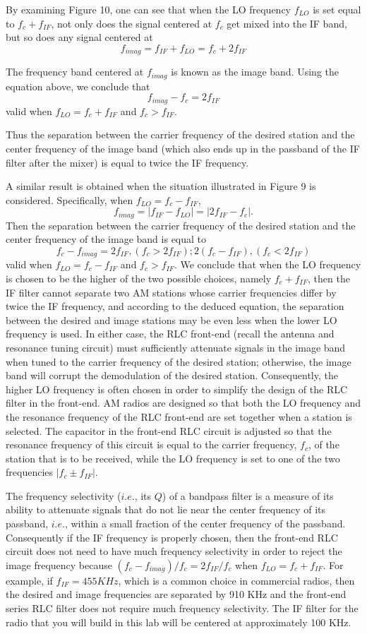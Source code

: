 \documentclass[utf8]{article}
\begin{document}
{	By examining Figure 10, one can see that when the LO frequency $f_{LO}$ is set equal to $f_c + f_{IF}$, not only does the signal centered at $f_c$ get mixed into the IF band, but so does any signal centered at
	$$f_{imag} = f_{IF} + f_{LO} = f_c + 2f_{IF}$$

	The frequency band centered at $f_{imag}$ is known as the image band. Using the equation above, we conclude that
	$$f_{imag}-f_c = 2f_{IF}$$
	valid when $f_{LO} = f_c + f_{IF}$ and $f_c >f_{IF}$.

	Thus the separation between the carrier frequency of the desired station and the center frequency of the image band (which also ends up in the passband of the IF filter after the mixer) is equal to twice the IF frequency.

	A similar result is obtained when the situation illustrated in Figure 9 is considered. Specifically, when $f_{LO} = f_c − f_{IF}$,
	$$f_{imag} = |f_{IF}-f_{LO}| = |2f_{IF}-f_c|.$$
	Then the separation between the carrier frequency of the desired station and the center frequency of the image band is equal to
	$$f_c -f_{imag} = 2f_{IF},(f_c>2f_{IF}); 2(f_c-f_{IF}),(f_c<2f_{IF})$$
	valid when $f_{LO} = f_c-f_{IF}$ and $f_c>f_{IF}$.
	We conclude that when the LO frequency is chosen to be the higher of the two possible choices, namely $f_c + f_{IF}$, then the IF filter cannot separate two AM stations whose carrier frequencies differ by twice the IF frequency, and according to the deduced equation, the separation between the desired and image stations may be even less when the lower LO frequency is used. In either case, the RLC front-end (recall the antenna and resonance tuning circuit) must sufficiently attenuate signals in the image band when tuned to the carrier frequency of the desired station; otherwise, the image band will corrupt the demodulation of the desired station. Consequently, the higher LO frequency is often chosen in order to simplify the design of the RLC filter in the front-end. AM radios are designed so that both the LO frequency and the resonance frequency of the RLC front-end are set together when a station is selected. The capacitor in the front-end RLC circuit is adjusted so that the resonance frequency of this circuit is equal to the carrier frequency, $f_c$, of the station that is to be received, while the LO frequency is set to one of the two frequencies $|f_c \pm f_{IF} |$.

	The frequency selectivity ($i.e.$, its $Q$) of a bandpass filter is a measure of its ability to attenuate signals that do not lie near the center frequency of its passband, $i.e.$, within a small fraction of the center frequency of the passband. Consequently if the IF frequency is properly chosen, then the front-end RLC circuit does not need to have much frequency selectivity in order to reject the image frequency because $(f_c-f_{imag})/f_c = 2f_{IF}/f_c$ when $f_{LO} = f_c + f_{IF}$. For example, if $f_{IF}= 455 KHz$, which is a common choice in commercial radios, then the desired and image frequencies are separated by 910 KHz and the front-end series RLC filter does not require much frequency selectivity. The IF filter for the radio that you will build in this lab will be centered at approximately 100 KHz.
}
\end{document}
